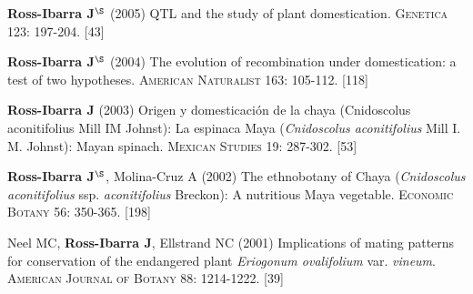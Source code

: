 \documentclass[letterpaper,10pt]{article}
\renewenvironment{itemize}{
  \begin{list}{}{
    \setlength{\leftmargin}{1.5em}
  }
}{
  \end{list}
}
\begin{document}
\begin{etaremune}
\item {\bf Ross-Ibarra J}$^\S$ (2005) QTL and the study of plant domestication.  \textsc{Genetica} 123: 197-204.
 [43]\\


\item {\bf Ross-Ibarra J}$^\S$ (2004) The evolution of recombination under domestication: a test of two hypotheses.  \textsc{American Naturalist} 163: 105-112.
 [118]\\


\item {\bf Ross-Ibarra J} (2003) Origen y domesticaci\'on de la chaya (Cnidoscolus aconitifolius Mill IM Johnst): La espinaca Maya (\emph{Cnidoscolus aconitifolius} Mill I. M. Johnst): Mayan spinach.  \textsc{Mexican Studies} 19: 287-302.
 [53]\\

\item {\bf Ross-Ibarra J}$^\S$, Molina-Cruz A (2002) The ethnobotany of Chaya (\emph{Cnidoscolus aconitifolius} ssp. \emph{aconitifolius} Breckon): A nutritious Maya vegetable. \textsc{Economic Botany} 56: 350-365.
 [198]\\

\item  Neel MC, {\bf Ross-Ibarra J}, Ellstrand NC (2001) Implications of mating patterns for conservation of the endangered plant \emph{Eriogonum ovalifolium} var. \emph{vineum}.  \textsc{American Journal of Botany} 88: 1214-1222.
 [39]\\
\end{etaremune}


\end{document}
